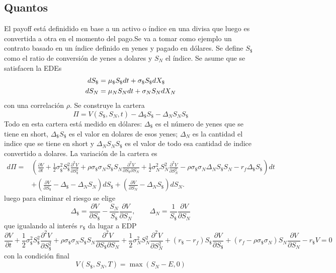 \subsection{Quantos}
El payoff está definidido en base a un activo o índice en una divisa que luego es convertida a otra en el momento del pago.Se va a tomar como ejemplo un contrato basado en un índice definido en yenes  y pagado en dólares. Se define $S_\$$ como el ratio de conversión de yenes a dolares y $S_N$ el índice. Se asume que se satisfacen la EDEs
\begin{align*}
    dS_\$ &= \mu_\$ S_\$ dt + \sigma_\$ S_\$ d\mathnormal{X_\$} \\
    dS_N &= \mu_N S_N dt + \sigma_N S_N d\mathnormal{X_N}
\end{align*}
con una correlación $\rho$. Se construye la cartera
\[
    \Pi = V(S_\$, S_N, t) - \Delta_\$ S_\$ - \Delta_N S_N S_\$
\]
Todo en esta cartera está medido en dólares: $\Delta_\$$ es el número de yenes que se tiene en short, $\Delta_\$ S_\$$ es el valor en dolares de esos yenes; $\Delta_N$ es la cantidad el indice que se tiene en short y $\Delta_N S_N S_\$$ es el valor de todo esa cantidad de indice convertido a dolares. La variación de la cartera es
\begin{align*}
    d\Pi = &\left( \frac{\partial V}{\partial t} + \frac{1}{2} \sigma_\$^2 S_\$^2 \frac{\partial^2 V}{\partial S_\$^2} + \rho \sigma_\$ \sigma_N S_\$ S_N \frac{\partial^2 V}{\partial S_\$  \partial S_N} + \frac{1}{2} \sigma_N^2 S_N^2 \frac{\partial^2 V}{\partial S_N^2}  - \rho \sigma_\$ \sigma_N \Delta_N S_\$ S_N - r_f \Delta_\$ S_\$ \right) dt \\
    &+ \left( \frac{\partial V}{\partial S_\$} - \Delta_\$ - \Delta_N S_N \right) dS_\$ + \left( \frac{\partial V}{\partial S_N} - \Delta_N S_\$ \right) dS_N.
\end{align*}
luego para eliminar el riesgo se elige
\[
    \Delta_\$ = \frac{\partial V}{\partial S_\$} - \frac{S_N}{S_\$} \frac{\partial V}{\partial S_N}, \qquad \Delta_N = \frac{1}{S_\$} \frac{\partial V}{\partial S_N}
\]
que igualando al interés $r_\$$ da lugar a EDP
\[
    \boxed{\frac{\partial V}{\partial t} + \frac{1}{2} \sigma_\$^2 S_\$^2 \frac{\partial^2 V}{\partial S_\$^2} + \rho \sigma_\$ \sigma_N S_\$ S_N \frac{\partial^2 V}{\partial S_\$  \partial S_N} + \frac{1}{2} \sigma_N^2 S_N^2 \frac{\partial^2 V}{\partial S_N^2} + (r_\$ - r_f) S_\$ \frac{\partial V}{\partial S_\$} + ( r_f - \rho \sigma_\$ \sigma_N) S_N \frac{\partial V}{\partial S_N} - r_\$ V = 0}
\]
con la condición final
\[
    V(S_\$, S_N, T) = \max\left( S_N - E, 0 \right)
\]

